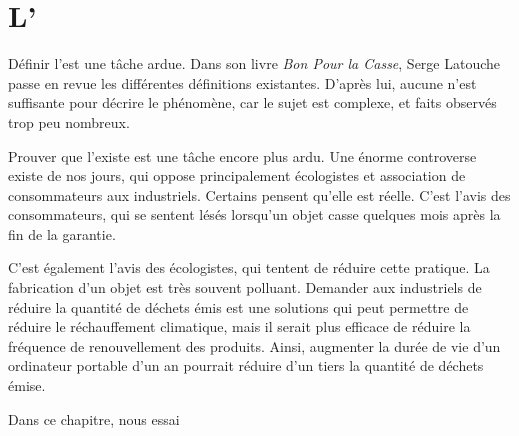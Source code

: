 \chapter{L'\OP}

Définir l'\op est une tâche ardue. Dans son livre \textit{Bon Pour la Casse}, Serge Latouche passe en revue les différentes définitions existantes. D'après lui, aucune n'est suffisante pour décrire le phénomène, car le sujet est complexe, et faits observés trop peu nombreux. 

Prouver que l'\op existe est une tâche encore plus ardu. Une énorme controverse existe de nos jours, qui oppose principalement écologistes et association de consommateurs aux industriels. 
\smallbreak
Certains pensent qu'elle est réelle. C'est l'avis des consommateurs, qui se sentent lésés lorsqu'un objet casse quelques mois après la fin de la garantie.

C'est également  l'avis des écologistes, qui tentent  de réduire cette pratique. La fabrication d'un objet est très souvent polluant. Demander aux industriels de réduire la quantité de déchets émis est une solutions qui peut permettre de réduire le réchauffement climatique, mais il serait plus efficace de réduire la fréquence de renouvellement des produits. Ainsi, augmenter  la durée de vie d'un ordinateur portable d'un an pourrait réduire d'un tiers la quantité de déchets émise.  

Dans ce chapitre, nous essai  
